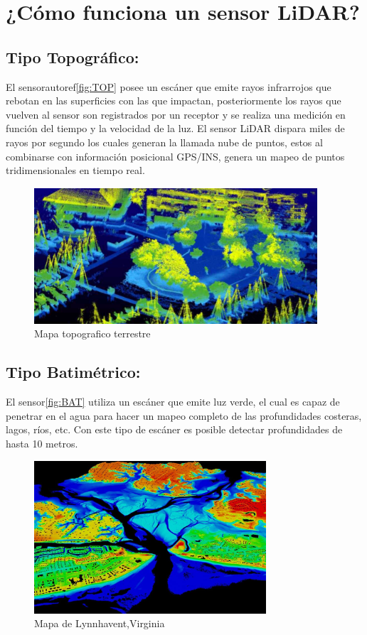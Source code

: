 \section*{¿Cómo funciona un sensor LiDAR?}

\subsection*{Tipo Topográfico:}
El sensorautoref\autoref{fig:TOP} posee un escáner que emite rayos infrarrojos que rebotan en las superficies con las que impactan, posteriormente los rayos que vuelven al sensor son registrados por un receptor y se realiza una medición en función del tiempo y la velocidad de la luz. El sensor LiDAR dispara miles de rayos por segundo los cuales generan la llamada nube de puntos, estos al combinarse con información posicional GPS/INS, genera un mapeo de puntos tridimensionales en tiempo real.\cite{NOAA_Lidar} 
\begin{figure}[h]
	\centering
	\includegraphics[width=0.3\linewidth]{img/TOP}
	\caption{Mapa topografico terrestre }
	\label{fig:TOP}
\end{figure}
\subsection*{Tipo Batimétrico:}
El sensor\autoref{fig:BAT} utiliza un escáner que emite luz verde, el cual es capaz de penetrar en el agua para hacer un mapeo completo de las profundidades costeras, lagos, ríos, etc. Con este tipo de escáner es posible detectar profundidades de hasta 10 metros.\cite{UAVLatam_Lidar}
\begin{figure}[h]
	\centering
	\includegraphics[width=0.3\linewidth]{img/BAT}
	\caption{Mapa de Lynnhavent,Virginia }
	\label{fig:BAT}
\end{figure}


